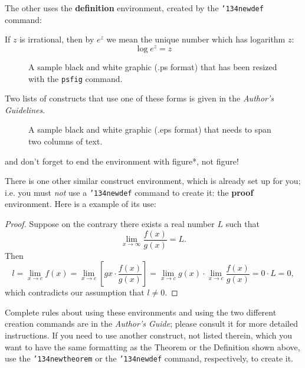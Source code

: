 \documentclass{acm_proc_article-sp}
\begin{document}
The other uses the \textbf{definition} environment, created
by the \texttt{{\char'134}newdef} command:
\begin{definition}
If $z$ is irrational, then by $e^z$ we mean the
unique number which has
logarithm $z$: \begin{displaymath}{\log e^z = z}\end{displaymath}
\end{definition}

\begin{figure}
\centering
\caption{A sample black and white graphic (.ps format) that has
been resized with the \texttt{psfig} command.}
\end{figure}

Two lists of constructs that use one of these
forms is given in the
\textit{Author's  Guidelines}.

\begin{figure}
\centering
\caption{A sample black and white graphic (.eps format)
that needs to span two columns of text.}
\end{figure}
and don't forget to end the environment with
{figure*}, not {figure}!
 
There is one other similar construct environment, which is
already set up
for you; i.e. you must \textit{not} use
a \texttt{{\char'134}newdef} command to
create it: the \textbf{proof} environment.  Here
is a example of its use:
\begin{proof}
Suppose on the contrary there exists a real number $L$ such that
\begin{displaymath}
\lim_{x\rightarrow\infty} \frac{f(x)}{g(x)} = L.
\end{displaymath}
Then
\begin{displaymath}
l=\lim_{x\rightarrow c} f(x)
= \lim_{x\rightarrow c}
\left[ g{x} \cdot \frac{f(x)}{g(x)} \right ]
= \lim_{x\rightarrow c} g(x) \cdot \lim_{x\rightarrow c}
\frac{f(x)}{g(x)} = 0\cdot L = 0,
\end{displaymath}
which contradicts our assumption that $l\neq 0$.
\end{proof}

Complete rules about using these environments and using the
two different creation commands are in the
\textit{Author's Guide}; please consult it for more
detailed instructions.  If you need to use another construct,
not listed therein, which you want to have the same
formatting as the Theorem
or the Definition\cite{salas:calculus} shown above,
use the \texttt{{\char'134}newtheorem} or the
\texttt{{\char'134}newdef} command,
respectively, to create it.
\end{document}
